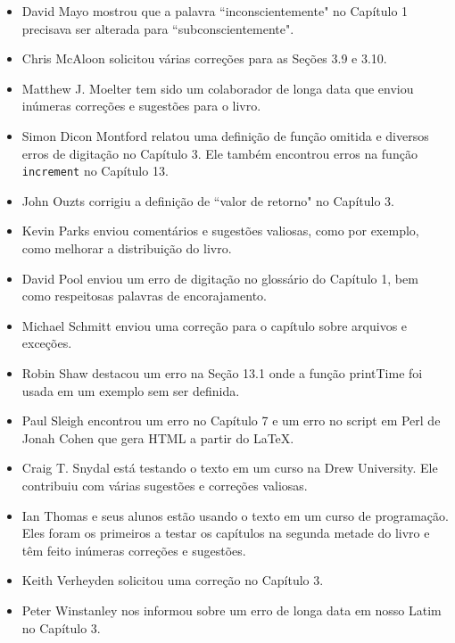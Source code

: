 \documentclass[10pt]{book}
\begin{document}
\begin {itemize}
\item David Mayo mostrou que a palavra ``inconscientemente"
no Capítulo 1 precisava
ser alterada para ``subconscientemente".

\item Chris McAloon solicitou várias correções para as Seções 3.9 e
3.10.

\item Matthew J. Moelter tem sido um colaborador de longa data que enviou
inúmeras correções e sugestões para o livro.

\item Simon Dicon Montford relatou uma definição de função omitida e
diversos erros de digitação no Capítulo 3. Ele também encontrou erros na
função {\tt increment} no Capítulo 13.

\item John Ouzts corrigiu a definição de ``valor de retorno"
no Capítulo 3.

\item Kevin Parks enviou comentários e sugestões valiosas, como
por exemplo, como melhorar a distribuição do livro.

\item David Pool enviou um erro de digitação no glossário do Capítulo 1, bem como
respeitosas palavras de encorajamento.

\item Michael Schmitt enviou uma correção para o capítulo sobre arquivos
e exceções.

\item Robin Shaw destacou um erro na Seção 13.1 onde a
função printTime foi usada em um exemplo sem ser definida.

\item Paul Sleigh encontrou um erro no Capítulo 7 e um erro
no script em Perl de Jonah Cohen que gera HTML a partir do \LaTeX.

\item Craig T. Snydal está testando o texto em um curso na Drew
University. Ele contribuiu com várias sugestões e correções valiosas.

\item Ian Thomas e seus alunos estão usando o texto em um curso de
programação. Eles foram os primeiros a testar os capítulos na segunda metade
do livro e têm feito inúmeras correções e sugestões.

\item Keith Verheyden solicitou uma correção no Capítulo 3.

\item Peter Winstanley nos informou sobre um erro de longa data em
nosso Latim no Capítulo 3.


\end{itemize}
\end{document}
